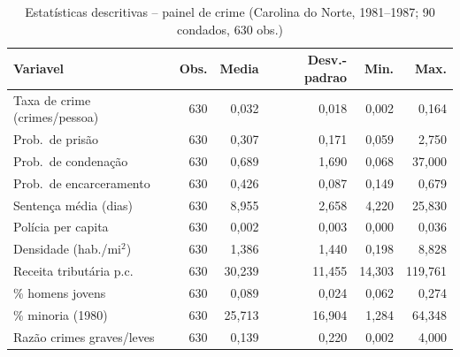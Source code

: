 \begin{table}[htbp]\centering
\caption{Estat\'isticas descritivas -- painel de crime (Carolina do Norte, 1981--1987; 90 condados, 630 obs.)}\label{tab:q3_descritivas}
\small
\begin{tabular}{lrrrrr}
\toprule
Variavel & Obs. & Media & Desv.-padrao & Min. & Max. \\
\midrule
Taxa de crime (crimes/pessoa) & 630 & 0,032 & 0,018 & 0,002 & 0,164 \\
Prob.\ de pris\~ao & 630 & 0,307 & 0,171 & 0,059 & 2,750 \\
Prob.\ de condena\c{c}\~ao & 630 & 0,689 & 1,690 & 0,068 & 37,000 \\
Prob.\ de encarceramento & 630 & 0,426 & 0,087 & 0,149 & 0,679 \\
Senten\c{c}a m\'edia (dias) & 630 & 8,955 & 2,658 & 4,220 & 25,830 \\
Pol\'icia per capita & 630 & 0,002 & 0,003 & 0,000 & 0,036 \\
Densidade (hab./mi$^2$) & 630 & 1,386 & 1,440 & 0,198 & 8,828 \\
Receita tribut\'aria p.c. & 630 & 30,239 & 11,455 & 14,303 & 119,761 \\
\% homens jovens & 630 & 0,089 & 0,024 & 0,062 & 0,274 \\
\% minoria (1980) & 630 & 25,713 & 16,904 & 1,284 & 64,348 \\
Raz\~ao crimes graves/leves & 630 & 0,139 & 0,220 & 0,002 & 4,000 \\
\bottomrule
\end{tabular}
\par\vspace{2pt}{\footnotesize\itshape Fonte: Cornwell e Trumbull (1994), painel de 90 condados da Carolina do Norte (1981-1987), via wooldridge::crime4. Elaboracao propria.}
\end{table}

